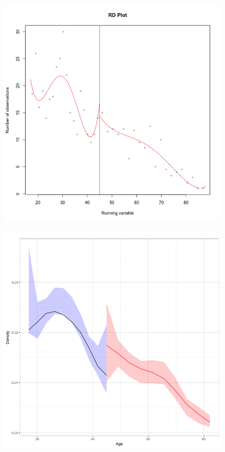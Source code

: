 \documentclass[a4paper]{article}
\begin{document}
\begin{figure}[!htb]
	\centering
		\centering
		\includegraphics[width=.8\linewidth]{Rplot3.png}
		\label{fig:test1}
\end{figure}

\begin{figure}[!htb]
		\centering
		\includegraphics[width=0.8\linewidth]{Rplot4.png}
		\label{fig:test2}
\end{figure}
\end{document}
